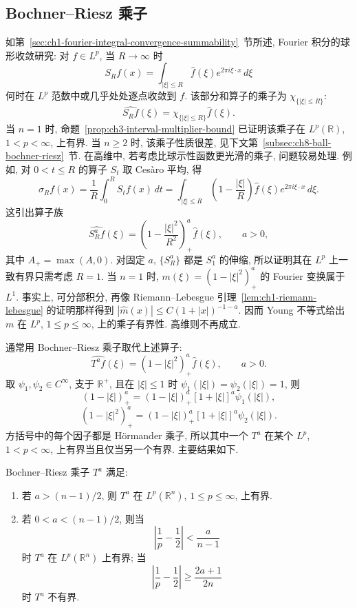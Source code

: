 \subsection{Bochner--Riesz 乘子}
\label{sec:ch8-bochner-riesz-multipliers}

如第~\ref{sec:ch1-fourier-integral-convergence-summability}~节所述, Fourier 积分的球形收敛研究: 对 $f\in L^p$, 当 $R\to\infty$ 时
\[
 S_Rf(x)=\int_{|\xi|\le R}\widehat f(\xi)e^{2\pi i\xi\cdot x}\,d\xi
\]
何时在 $L^p$ 范数中或几乎处处逐点收敛到 $f$. 该部分和算子的乘子为 $\chi_{\{|\xi|\le R\}}$:
\[
 \widehat{S_Rf}(\xi)=\chi_{\{|\xi|\le R\}}\widehat f(\xi).
\]
当 $n=1$ 时, 命题~\ref{prop:ch3-interval-multiplier-bound} 已证明该乘子在 $L^p(\mathbb R)$, $1<p<\infty$, 上有界. 当 $n\ge2$ 时, 该乘子性质很差, 见下文第~\ref{subsec:ch8-ball-bochner-riesz}~节. 在高维中, 若考虑比球示性函数更光滑的乘子, 问题较易处理. 例如, 对 $0<t\le R$ 的算子 $S_t$ 取 Cesàro 平均, 得
\[
 \sigma_Rf(x)=\frac1R\int_0^RS_tf(x)\,dt
 =\int_{|\xi|\le R}\left(1-\frac{|\xi|}{R}\right)\widehat f(\xi)e^{2\pi i\xi\cdot x}\,d\xi.
\]
这引出算子族
\[
 \widehat{S_R^af}(\xi)=\left(1-\frac{|\xi|^2}{R^2}\right)_+^a\widehat f(\xi),
 \qquad a>0,
\]
其中 $A_+=\max(A,0)$. 对固定 $a$, $\{S_R^a\}$ 都是 $S_1^a$ 的伸缩, 所以证明其在 $L^p$ 上一致有界只需考虑 $R=1$. 当 $n=1$ 时, $m(\xi)=(1-|\xi|^2)_+^a$ 的 Fourier 变换属于 $L^1$. 事实上, 可分部积分, 再像 Riemann--Lebesgue 引理~\ref{lem:ch1-riemann-lebesgue} 的证明那样得到 $|\widehat m(x)|\le C(1+|x|)^{-1-a}$. 因而 Young 不等式给出 $m$ 在 $L^p$, $1\le p\le\infty$, 上的乘子有界性. 高维则不再成立.

通常用 Bochner--Riesz 乘子取代上述算子:
\[
 \widehat{T^af}(\xi)=(1-|\xi|^2)_+^a\widehat f(\xi),
 \qquad a>0.
\]
取 $\psi_1,\psi_2\in C^\infty$, 支于 $\mathbb R^+$, 且在 $|\xi|\le1$ 时 $\psi_1(|\xi|)=\psi_2(|\xi|)=1$, 则
\[
 (1-|\xi|)_+^a=(1-|\xi|)_+^a[1+|\xi|]^a\psi_1(|\xi|),
\]
\[
 (1-|\xi|^2)_+^a=(1-|\xi|)_+^a[1+|\xi|]^a\psi_2(|\xi|).
\]
方括号中的每个因子都是 Hörmander 乘子, 所以其中一个 $T^a$ 在某个 $L^p$, $1<p<\infty$, 上有界当且仅当另一个有界. 主要结果如下.

\hypertarget{chapter-08-page-181}{}
\begin{Theorem}
\label{thm:ch8-bochner-riesz}
Bochner--Riesz 乘子 $T^a$ 满足:
\begin{enumerate}[label=(\arabic*)]
\item 若 $a>(n-1)/2$, 则 $T^a$ 在 $L^p(\mathbb R^n)$, $1\le p\le\infty$, 上有界.
\item 若 $0<a<(n-1)/2$, 则当
\[
 \left|\frac1p-\frac12\right|<\frac a{n-1}
\]
时 $T^a$ 在 $L^p(\mathbb R^n)$ 上有界; 当
\[
 \left|\frac1p-\frac12\right|\ge\frac{2a+1}{2n}
\]
时 $T^a$ 不有界.
\end{enumerate}
\end{Theorem}

